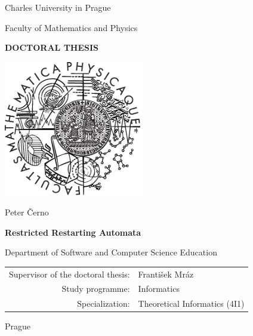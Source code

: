 \documentclass[12pt,a4paper,twoside,openright,natbib]{book}
\begin{document}


\pagestyle{empty}
\begin{center}

\large

Charles University in Prague

\medskip

Faculty of Mathematics and Physics

\vfill

{\bf\Large DOCTORAL THESIS}

\vfill

\centerline{\mbox{\includegraphics[width=60mm]{img/logo.eps}}}

\vfill
\vspace{5mm}

{\LARGE Peter Černo}

\vspace{15mm}

{\LARGE\bfseries Restricted Restarting Automata}

\vfill

Department of Software and Computer Science Education

\vfill

\begin{tabular}{rl}

Supervisor of the doctoral thesis: & František Mráz \\
\noalign{\vspace{2mm}}
Study programme: & Informatics \\
\noalign{\vspace{2mm}}
Specialization: & Theoretical Informatics (4I1) \\
\end{tabular}

\vfill

Prague \the\year

\end{center}
\end{document}
